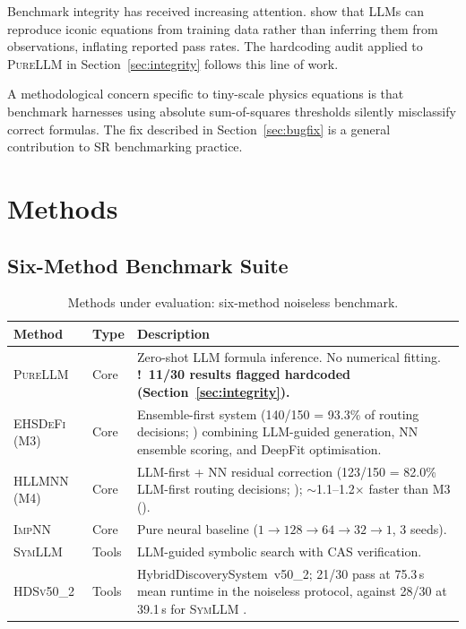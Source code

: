 \documentclass[twoside,11pt]{article}
\newcommand{\PureLLM}{\textsc{PureLLM}}
\newcommand{\INN}{\textsc{ImpNN}}
\newcommand{\EHD}{\textsc{EHSDeFi}}
\newcommand{\HSL}{\textsc{HLLMNN}}
\newcommand{\SEL}{\textsc{SymLLM}}
\newcommand{\HDS}{\textsc{HDSv50\_2}}
\newcommand{\warn}{{\color{warnAmber}\textbf{!}}}
\begin{document}
Benchmark integrity has received increasing attention.
\citet{memorization2024audit} show that LLMs can reproduce iconic equations
from training data rather than inferring them from observations, inflating
reported pass rates.  The hardcoding audit applied to \PureLLM{} in
Section~\ref{sec:integrity} follows this line of work.

A methodological concern specific to tiny-scale physics equations is that
benchmark harnesses using absolute sum-of-squares thresholds silently
misclassify correct formulas.  The fix described in Section~\ref{sec:bugfix}
is a general contribution to SR benchmarking practice.

\section{Methods}
\label{sec:methods}

\subsection{Six-Method Benchmark Suite}
\label{sec:methods:sixmethod}

\begin{table}[ht]
\caption{Methods under evaluation: six-method noiseless benchmark.}
\label{tab:methods}
\centering
\small
\renewcommand{\arraystretch}{1.3}
\begin{tabular}{L{2.1cm} L{1.3cm} L{8.0cm}}
\toprule
\textbf{Method} & \textbf{Type} & \textbf{Description} \\
\midrule
{}
\PureLLM & Core &
  Zero-shot LLM formula inference.  No numerical fitting.
  \textbf{\warn~11/30 results flagged hardcoded (Section~\ref{sec:integrity}).} \\
\EHD\,(M3) & Core &
  Ensemble-first system (140/150 = 93.3\% of routing decisions; ) combining LLM-guided generation,
  NN ensemble scoring, and DeepFit optimisation. \\
\HSL\,(M4) & Core &
  LLM-first + NN residual correction (123/150 = 82.0\% LLM-first routing decisions; );
  $\sim$1.1--1.2$\times$ faster than M3 (). \\
\INN & Core &
  Pure neural baseline ($1\!\to\!128\!\to\!64\!\to\!32\!\to\!1$, 3 seeds). \\
\SEL & Tools &
  LLM-guided symbolic search with CAS verification. \\
\HDS & Tools &
  HybridDiscoverySystem~v50\_2; 21/30 pass at 75.3\,s mean runtime in the noiseless protocol, against 28/30 at 39.1\,s for \SEL{} . \\
\bottomrule
\end{tabular}
\end{table}
\end{document}
